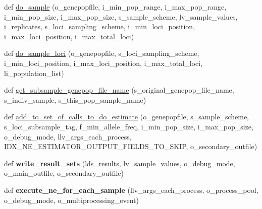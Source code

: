 \begin{DoxyCompactItemize}
\item 
def \hyperlink{namespacenegui_1_1pgdriveneestimator_ad98319dc7ae03effe9fb2aa1cabaaf5a}{do\+\_\+sample} (o\+\_\+genepopfile, i\+\_\+min\+\_\+pop\+\_\+range, i\+\_\+max\+\_\+pop\+\_\+range, i\+\_\+min\+\_\+pop\+\_\+size, i\+\_\+max\+\_\+pop\+\_\+size, s\+\_\+sample\+\_\+scheme, lv\+\_\+sample\+\_\+values, i\+\_\+replicates, s\+\_\+loci\+\_\+sampling\+\_\+scheme, i\+\_\+min\+\_\+loci\+\_\+position, i\+\_\+max\+\_\+loci\+\_\+position, i\+\_\+max\+\_\+total\+\_\+loci)
\item 
def \hyperlink{namespacenegui_1_1pgdriveneestimator_a0f8c557a38f7d89e3e494696c863311f}{do\+\_\+sample\+\_\+loci} (o\+\_\+genepopfile, s\+\_\+loci\+\_\+sampling\+\_\+scheme, i\+\_\+min\+\_\+loci\+\_\+position, i\+\_\+max\+\_\+loci\+\_\+position, i\+\_\+max\+\_\+total\+\_\+loci, li\+\_\+population\+\_\+list)
\item 
def \hyperlink{namespacenegui_1_1pgdriveneestimator_a84955fc339f0354149185b5fa6444340}{get\+\_\+subsample\+\_\+genepop\+\_\+file\+\_\+name} (s\+\_\+original\+\_\+genepop\+\_\+file\+\_\+name, s\+\_\+indiv\+\_\+sample, s\+\_\+this\+\_\+pop\+\_\+sample\+\_\+name)
\item 
def \hyperlink{namespacenegui_1_1pgdriveneestimator_ab0bca56261e2d7951b4c7a65897ee053}{add\+\_\+to\+\_\+set\+\_\+of\+\_\+calls\+\_\+to\+\_\+do\+\_\+estimate} (o\+\_\+genepopfile, s\+\_\+sample\+\_\+scheme, s\+\_\+loci\+\_\+subsample\+\_\+tag, f\+\_\+min\+\_\+allele\+\_\+freq, i\+\_\+min\+\_\+pop\+\_\+size, i\+\_\+max\+\_\+pop\+\_\+size, o\+\_\+debug\+\_\+mode, llv\+\_\+args\+\_\+each\+\_\+process, I\+D\+X\+\_\+\+N\+E\+\_\+\+E\+S\+T\+I\+M\+A\+T\+O\+R\+\_\+\+O\+U\+T\+P\+U\+T\+\_\+\+F\+I\+E\+L\+D\+S\+\_\+\+T\+O\+\_\+\+S\+K\+IP, o\+\_\+secondary\+\_\+outfile)
\item 
def {\bfseries write\+\_\+result\+\_\+sets} (lds\+\_\+results, lv\+\_\+sample\+\_\+values, o\+\_\+debug\+\_\+mode, o\+\_\+main\+\_\+outfile, o\+\_\+secondary\+\_\+outfile)\hypertarget{namespacenegui_1_1pgdriveneestimator_aa45ae8154c350b0a30ba8c1037bfd445}{}\label{namespacenegui_1_1pgdriveneestimator_aa45ae8154c350b0a30ba8c1037bfd445}

\item 
def {\bfseries execute\+\_\+ne\+\_\+for\+\_\+each\+\_\+sample} (llv\+\_\+args\+\_\+each\+\_\+process, o\+\_\+process\+\_\+pool, o\+\_\+debug\+\_\+mode, o\+\_\+multiprocessing\+\_\+event)\hypertarget{namespacenegui_1_1pgdriveneestimator_aefaaafaa951edf46424dfc57535046a7}{}\label{namespacenegui_1_1pgdriveneestimator_aefaaafaa951edf46424dfc57535046a7}


\end{DoxyCompactItemize}
